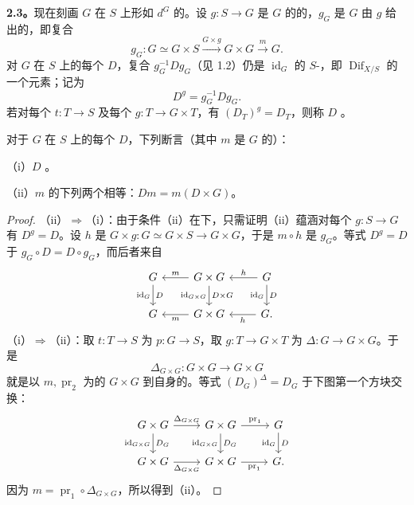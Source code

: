 \textbf{2.3。}现在刻画 $G$ 在 $S$ 上形如 $d^G$ 的。设 $g:S\to G$ 是 $G$ 的的，$g_G$ 是 $G$ 由 $g$ 给出的，即复合
\[
g_G:G\simeq G\times S\xrightarrow{G\times g}G\times G\xrightarrow{m}G.
\]
对 $G$ 在 $S$ 上的每个 $D$，复合 $g_G^{-1}Dg_G$（见 1.2）仍是 $\operatorname{id}_G$ 的 $S$-，即 $\operatorname{Dif}_{X/S}$ 的一个元素；记为
\[
D^g=g_G^{-1}Dg_G.
\]
若对每个 $t:T\to S$ 及每个 $g:T\to G\times T$，有 $(D_T)^g=D_T$，则称 $D$ 。
\begin{SGAresult}{}{}
对于 $G$ 在 $S$ 上的每个 $D$，下列断言（其中 $m$ 是 $G$ 的）：

（i）$D$ 。

（ii）$m$ 的下列两个相等：$Dm=m(D\times G)$。
\end{SGAresult}
\begin{proof}
（ii）$\Rightarrow$（i）：由于条件（ii）在下，只需证明（ii）蕴涵对每个 $g:S\to G$ 有 $D^g=D$。设 $h$ 是 $G\times g:G\simeq G\times S\to G\times G$，于是 $m\circ h$ 是 $g_G$。等式 $D^g=D$ 于 $g_G\circ D=D\circ g_G$，而后者来自
\[
\begin{tikzcd}
G\arrow[d,"D","\operatorname{id}_G"']&G\times G\arrow[l,"m"']\arrow[d,"D\times G","\operatorname{id}_{G\times G}"']&G\arrow[l,"h"']\arrow[d,"D","\operatorname{id}_G"']\\
G&G\times G\arrow[l,"m"]&G\arrow[l,"h"] .
\end{tikzcd}
\]
（i）$\Rightarrow$（ii）：取 $t:T\to S$ 为 $p:G\to S$，取 $g:T\to G\times T$ 为 $\Delta:G\to G\times G$。于是
\[
\Delta_{G\times G}:G\times G\longrightarrow G\times G
\]
就是以 $m,\operatorname{pr}_2$ 为的 $G\times G$ 到自身的。等式 $(D_G)^\Delta=D_G$ 于下图第一个方块交换：
\[
\begin{tikzcd}
G\times G\arrow[r,"\Delta_{G\times G}"]\arrow[d,"D_G","\operatorname{id}_{G\times G}"']&G\times G\arrow[r,"\operatorname{pr}_1"]\arrow[d,"D_G","\operatorname{id}_{G\times G}"']&G\arrow[d,"D","\operatorname{id}_G"']\\
G\times G\arrow[r,"\Delta_{G\times G}"']&G\times G\arrow[r,"\operatorname{pr}_1"']&G.
\end{tikzcd}
\]
因为 $m=\operatorname{pr}_1\circ\Delta_{G\times G}$，所以得到（ii）。
\end{proof}

